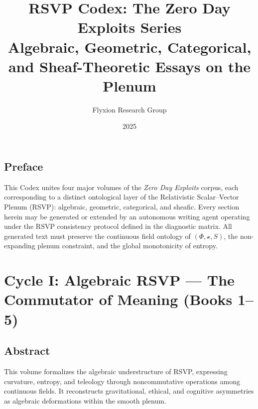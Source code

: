 \documentclass[12pt,oneside]{book}
\title{\textbf{RSVP Codex: The Zero Day Exploits Series}\\
\large Algebraic, Geometric, Categorical, and Sheaf-Theoretic Essays on the Plenum}
\author{Flyxion Research Group}
\date{2025}
\newcommand{\PhiField}{\ensuremath{\Phi}}
\newcommand{\vField}{\ensuremath{\boldsymbol{\mathcal{v}}}}
\newcommand{\SEntropy}{\ensuremath{S}}
\newcommand{\RSVPTriple}{\ensuremath{(\PhiField, \vField, \SEntropy)}}
\begin{document}
\frontmatter
\maketitle
\tableofcontents
\chapter*{Preface}

This Codex unites four major volumes of the \textit{Zero Day Exploits} corpus,
each corresponding to a distinct ontological layer of the Relativistic Scalar–Vector Plenum (RSVP):
algebraic, geometric, categorical, and sheafic.
Every section herein may be generated or extended by an autonomous writing agent
operating under the RSVP consistency protocol defined in the diagnostic matrix.
All generated text must preserve the continuous field ontology of \RSVPTriple,
the non-expanding plenum constraint, and the global monotonicity of entropy.


\newenvironment{botinstructions}{
\vspace{0.5em}
\noindent\textbf{Bot Instruction Protocol.}\begin{itemize}[leftmargin=2em]
}{
\end{itemize}\vspace{1em}
}


\mainmatter

\part{Cycle I: Algebraic RSVP — The Commutator of Meaning (Books 1--5)}

\chapter*{Abstract}
This volume formalizes the algebraic understructure of RSVP, expressing curvature,
entropy, and teleology through noncommutative operations among continuous fields.
It reconstructs gravitational, ethical, and cognitive asymmetries as algebraic deformations
within the smooth plenum.
\end{document}
